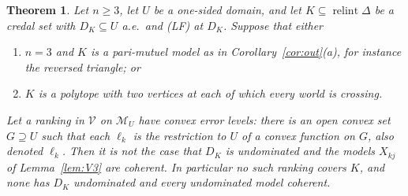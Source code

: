 \documentclass[11pt]{article}
\newcommand{\M}{\mathcal{M}}
\newcommand{\VV}{\mathcal{V}}
\DeclareMathOperator{\relint}{relint}
\theoremstyle{plain}
\newtheorem{theorem}{Theorem}[section]
\theoremstyle{definition}
\theoremstyle{remark}
\begin{document}
\begin{theorem}\label{thm:convexerror}
Let $n\ge3$, let $U$ be a one-sided domain, and let $K\subseteq\relint\Delta$ be a credal
set with $D_K\subseteq U$ a.e.\ and (LF) at $D_K$. Suppose that either
\begin{enumerate}[label=(\alph*)]
  \item $n=3$ and $K$ is a pari-mutuel model as in Corollary~\ref{cor:out}(a), for
  instance the reversed triangle; or
  \item $K$ is a polytope with two vertices at each of which every world is crossing.
\end{enumerate}
Let a ranking in $\VV$ on $\M_U$ have convex error levels: there is an open convex set
$G\supseteq U$ such that each $\ell_k$ is the restriction to $U$ of a convex function on
$G$, also denoted $\ell_k$. Then it is not the case that $D_K$ is undominated and the
models $X_{kj}$ of Lemma~\ref{lem:V3} are coherent. In particular no such ranking covers
$K$, and none has $D_K$ undominated and every undominated model coherent.
\end{theorem}
\end{document}
